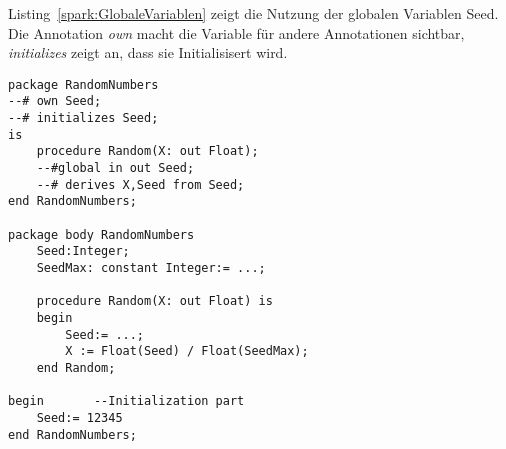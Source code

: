 Listing~\ref{spark:GlobaleVariablen} zeigt die Nutzung der globalen Variablen Seed. Die Annotation \textit{own} macht die Variable für andere Annotationen sichtbar, \textit{initializes} zeigt an, dass sie Initialisisert wird.


\begin{lstlisting}[caption={Globale Variablen}, label=spark:GlobaleVariablen]
package RandomNumbers
--# own Seed;
--# initializes Seed;
is
	procedure Random(X: out Float);
	--#global in out Seed;
	--# derives X,Seed from Seed;
end RandomNumbers;

package body RandomNumbers
	Seed:Integer;
	SeedMax: constant Integer:= ...;
	
	procedure Random(X: out Float) is
	begin
		Seed:= ...;
		X := Float(Seed) / Float(SeedMax);
	end Random;
	
begin		--Initialization part
	Seed:= 12345
end RandomNumbers;
\end{lstlisting}